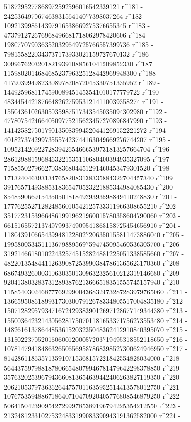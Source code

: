        5187295277868972592596016542339121 r^181 - 
       24253649706746383156414077398037264 r^182 - 
       109213998614397916538669275376655345 r^183 - 
       473791272676968496681718062978420606 r^184 - 
       1980770790363520329649725766557399736 r^185 - 
       7981558220343737173933021159727670132 r^186 - 
       30996762032018219391088561041509852330 r^187 - 
       115980201468468523796325128442969948300 r^188 - 
       417903994982330897820872045330751335952 r^189 - 
       1449259681174590089451453541010177779722 r^190 - 
       4834454421876648262759531214110039358274 r^191 - 
       15504361026305035987517343545035094302980 r^192 - 
       47780754246640509775215623457270896847990 r^193 - 
       141425827501790135083994520441269132221272 r^194 - 
       401827374299735557423744163049669276744207 r^195 - 
       1095214209227283942654666539731813257664704 r^196 - 
       2861298815968463221535110680400394935327095 r^197 - 
       7158550279662703836804451291460453479301520 r^198 - 
       17132404639313476582083138335884322704457340 r^199 - 
       39176571493885318365470523221885344984085430 r^200 - 
       85485906691543505018184929393598849410248830 r^201 - 
       177762552712824856010542125733311966308655210 r^202 - 
       351772315396648619919621960015780358604790060 r^203 - 
       661516557213749799374909541868158725454656910 r^204 - 
       1180439106654399481228027206350155811473886040 r^205 - 
       1995800534511136798895697594745095460536305700 r^206 - 
       3192146618010224325745152824881225051338585660 r^207 - 
       4822013548441126390872539903847861365623170360 r^208 - 
       6867493260003106303501309632325610212319146680 r^209 - 
       9204138032837312893876213666518351555745157940 r^210 - 
       11585403024687776929900436832473287283979765060 r^211 - 
       13665950861899317303007912678334805517004835180 r^212 - 
       15071282957934716724293839012697128677149344380 r^213 - 
       15500364232143056281750701181653371756273553480 r^214 - 
       14826161378644853615203235048362412910840395070 r^215 - 
       13150223705201606001200057203719495318552118650 r^216 - 
       10781479418486326506569587868398527300624946950 r^217 - 
       8142861186357135910715368157221842554828034000 r^218 - 
       5644375979881878066548079946781479642298378850 r^219 - 
       3576320253967943660813654639442406263827119350 r^220 - 
       2062105379736362644757011635952514413578012750 r^221 - 
       1076753594886718640710470920405776808546879250 r^222 - 
       506415042390954272999785389196794225354212550 r^223 - 
       213248123310275324833199083390943191362582000 r^224 - 
